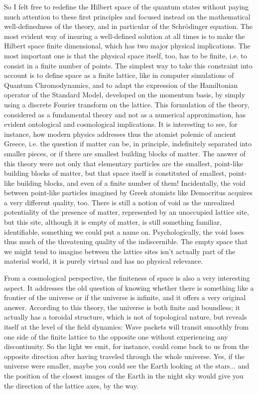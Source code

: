 So I felt free to redefine the Hilbert space of the quantum states without paying much attention to these first principles and focused instead on the mathematical well-definedness of the theory, and in particular of the Schrödinger equation. The most evident way of insuring a well-defined solution at all times is to make the Hilbert space finite dimensional, which has two major physical implications. The most important one is that the physical space itself, too, has to be finite, i.e. to consist in a finite number of points. The simplest way to take this constraint into account is to define space as a finite lattice, like in computer simulations of Quantum Chromodynamics, and to adapt the expression of the Hamiltonian operator of the Standard Model, developed on the momentum basis, by simply using a discrete Fourier transform on the lattice. This formulation of the theory, considered as a fundamental theory and not as a numerical approximation, has evident ontological and cosmological implications. It is interesting to see, for instance, how modern physics addresses thus the atomist polemic of ancient Greece, i.e. the question if matter can be, in principle, indefinitely separated into smaller pieces, or if there are smallest building blocks of matter. The answer of this theory were not only that elementary particles are the smallest, point-like building blocks of matter, but that space itself is constituted of smallest, point-like building blocks, and even of a finite number of them! Incidentally, the void between point-like particles imagined by Greek atomists like Democritus acquires a very different quality, too. There is still a notion of void as the unrealized potentiality of the presence of matter, represented by an unoccupied lattice site, but this site, although it is empty of matter, is still something familiar, identifiable, something we could put a name on. Psychologically, the void loses thus much of the threatening quality of the indiscernible. The empty space that we might tend to imagine between the lattice sites isn't actually part of the material world, it is purely virtual and has no physical relevance.

From a cosmological perspective, the finiteness of space is also a very interesting aspect. It addresses the old question of knowing whether there is something like a frontier of the universe or if the universe is infinite, and it offers a very original answer. According to this theory, the universe is both finite and boundless; it actually has a toroidal structure, which is not of topological nature, but reveals itself at the level of the field dynamics: Wave packets will transit smoothly from one side of the finite lattice to the opposite one without experiencing any discontinuity. So the light we emit, for instance, could come back to us from the opposite direction after having traveled through the whole universe. Yes, if the universe were smaller, maybe you could see the Earth looking at the stars... and the position of the closest images of the Earth in the night sky would give you the direction of the lattice axes, by the way.

